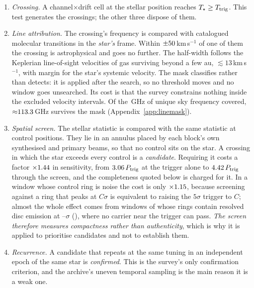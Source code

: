 \begin{enumerate}[label=(\roman*),leftmargin=1.9em,itemsep=2pt,topsep=3pt,parsep=0pt]
\item \emph{Crossing.} A channel$\times$drift cell at the stellar
position reaches $T_\star\geq T_{\rm trig}$. This test generates the
crossings; the other three dispose of them.
\item \emph{Line attribution.} The crossing's frequency is compared with
catalogued molecular transitions in the \emph{star's} frame. Within
$\pm50$\,km\,s$^{-1}$ of one of them the crossing is
astrophysical and goes no further. The half-width follows the Keplerian
line-of-sight velocities of gas surviving beyond a few au,
${\lesssim}13$\,km\,s$^{-1}$, with margin for the star's systemic
velocity. The mask
classifies rather than detects: it is applied after the search, so no
threshold moves and no window goes unsearched. Its cost is that the
survey constrains nothing inside the excluded velocity intervals. Of the
\UnionGHz\,GHz of unique sky frequency covered,
${\approx}113.3$\,GHz survives the mask
(Appendix~\ref{app:linemask}).
\item \emph{Spatial screen.} The stellar statistic is compared with the
same statistic at \NCtrl{} control positions. They lie in an annulus
placed by each block's own synthesised and primary beams, so that no
control sits on the star. A crossing in which the star exceeds every
control is a \emph{candidate}. Requiring it costs a factor
$\times1.44$ in sensitivity, from $3.06\,P_{\rm trig}$ at
the trigger alone to $4.42\,P_{\rm trig}$ through the screen,
and the completeness quoted below is charged for it. In a window whose
control ring is noise the cost is only $\times1.15$, because
screening against a ring that peaks at $C\sigma$ is equivalent to raising
the $5\sigma$ trigger to $C$; almost the whole effect comes from
\ScrNBright{} windows of \ScrNWinA{} whose rings contain resolved disc
emission at \ScrBrightLo--\ScrBrightHi$\sigma$ (\ScrBrightStars), where no
carrier near the trigger can pass. \emph{The screen therefore measures
compactness rather than authenticity}, which is why it is applied to
prioritise candidates and not to establish them.
\item \emph{Recurrence.} A candidate that repeats at the same tuning in
an independent epoch of the same star is \emph{confirmed}. This is the
survey's only confirmation criterion, and the archive's uneven temporal
sampling is the main reason it is a weak one.
\end{enumerate}

